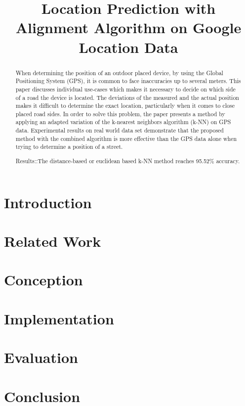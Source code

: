 \documentclass[conference]{IEEEtran}
\begin{document}
\title{Location Prediction with Alignment Algorithm on Google Location Data}

\author{
}
	

\maketitle

\begin{abstract}
When determining the position of an outdoor placed device, by using the Global Positioning System (GPS), it is common to face inaccuracies up to several meters. This paper discusses individual use-cases which makes it necessary to decide on which side of a road the device is located. The deviations of the measured and the actual position makes it difficult to determine the exact location, particularly when it comes to close placed road sides. In order to solve this problem, the paper presents a method by applying an adapted variation of the k-nearest neighbors algorithm (k-NN) on GPS data.
Experimental results on real world data set demonstrate that the proposed method with the combined algorithm is more effective than the GPS data alone when trying to determine a position of a street.

Results::The distance-based or euclidean based k-NN method reaches 95.52\% accuracy.

\end{abstract}

\IEEEpeerreviewmaketitle

\section{Introduction}\label{section:introduction}


\section{Related Work}\label{section:relatedWork}


\section{Conception}\label{section:conception}


\section{Implementation}\label{section:implementation}


\section{Evaluation}\label{section:evaluation}


\section{Conclusion}\label{section:conclusion}

%
%
\end{document}
